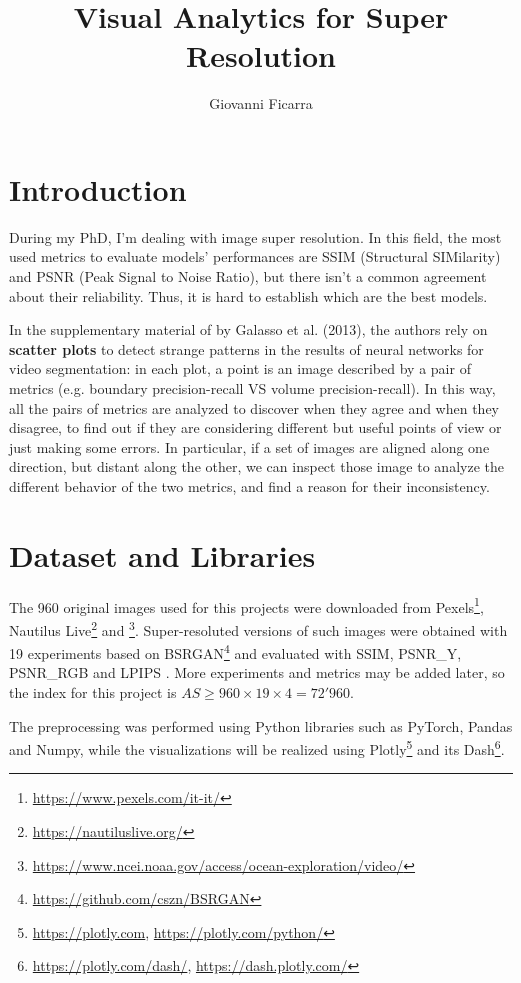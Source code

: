 \documentclass{article}
\title{Visual Analytics for Super Resolution}
\author{Giovanni Ficarra}
\date{}
\begin{document}
	\maketitle

	\section{Introduction}
	
	During my PhD, I'm dealing with image super resolution. In this field, the most used metrics to evaluate models' performances are SSIM (Structural SIMilarity) and PSNR (Peak Signal to Noise Ratio), but there isn't a common agreement about their reliability. Thus, it is hard to establish which are the best models.
	
	In the supplementary material \cite{galassounified} of \cite{galasso2013unified} by Galasso et al. (2013), the authors rely on \textbf{scatter plots} to detect strange patterns in the results of neural networks for video segmentation: in each plot, a point is an image described by a pair of metrics (e.g. boundary precision-recall VS volume precision-recall). In this way, all the pairs of metrics are analyzed to discover when they agree and when they disagree, to find out if they are considering different but useful points of view or just making some errors.
	In particular, if a set of images are aligned along one direction, but distant along the other, we can inspect those image to analyze the different behavior of the two metrics, and find a reason for their inconsistency.


	\section{Dataset and Libraries}

	The 960 original images used for this projects were downloaded from Pexels\footnote{\url{https://www.pexels.com/it-it/}}, Nautilus Live\footnote{\url{https://nautiluslive.org/}} and \cite{pacific}\footnote{\url{https://www.ncei.noaa.gov/access/ocean-exploration/video/}}. Super-resoluted versions of such images were obtained with 19 experiments based on BSRGAN\footnote{\url{https://github.com/cszn/BSRGAN}} \cite{bsrgan} and evaluated with SSIM, PSNR\_Y, PSNR\_RGB and LPIPS \cite{lpips}.
	More experiments and metrics may be added later, so the index for this project is $AS \geq 960 \times 19 \times 4 = 72'960$.
	
	The preprocessing was performed using Python libraries such as PyTorch, Pandas and Numpy, while the visualizations will be realized using Plotly\footnote{\url{https://plotly.com}, \url{https://plotly.com/python/}} and its Dash\footnote{\url{https://plotly.com/dash/}, \url{https://dash.plotly.com/}}.
\end{document}
